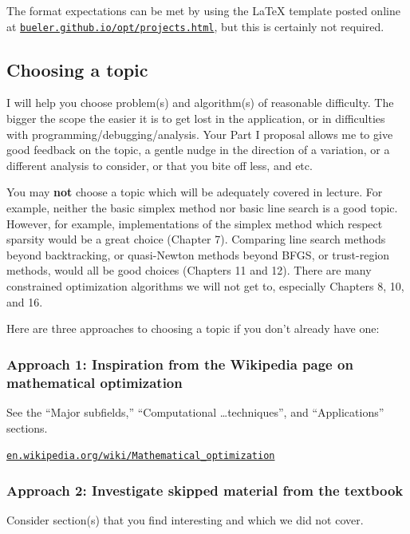 \documentclass[12pt]{amsart}
\begin{document}
The format expectations can be met by using the \LaTeX\xspace template posted online at \href{https://bueler.github.io/opt/projects.html}{\texttt{bueler.github.io/opt/projects.html}}, but this is certainly not required.


\subsection*{Choosing a topic}  I will help you choose problem(s) and algorithm(s) of reasonable difficulty.  The bigger the scope the easier it is to get lost in the application, or in difficulties with programming/debugging/analysis.  Your Part I proposal allows me to give good feedback on the topic, a gentle nudge in the direction of a variation, or a different analysis to consider, or that you bite off less, and etc.

You may \textbf{not} choose a topic which will be adequately covered in lecture.  For example, neither the basic simplex method nor basic line search is a good topic.  However, for example, implementations of the simplex method which respect sparsity would be a great choice (Chapter 7).  Comparing line search methods beyond backtracking, or quasi-Newton methods beyond BFGS, or trust-region methods, would all be good choices (Chapters 11 and 12).  There are many constrained optimization algorithms we will not get to, especially Chapters 8, 10, and 16. 

Here are three approaches to choosing a topic if you don't already have one:

\subsubsection*{Approach 1: Inspiration from the Wikipedia page on mathematical optimization}

See the ``Major subfields,'' ``Computational \dots techniques'', and ``Applications'' sections.

   \centerline{\href{https://en.wikipedia.org/wiki/Mathematical_optimization}{\texttt{en.wikipedia.org/wiki/Mathematical\_optimization}}}

\subsubsection*{Approach 2: Investigate skipped material from the textbook}  Consider section(s) that you find interesting and which we did not cover.
\end{document}

